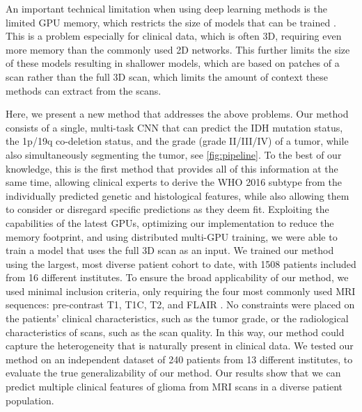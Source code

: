 An important technical limitation when using deep learning methods is the limited GPU memory, which restricts the size of models that can be trained \autocite{kopuklu2019cnn}.
This is a problem especially for clinical data, which is often 3D, requiring even more memory than the commonly used 2D networks.
This further limits the size of these models resulting in shallower models, which are based on patches of a scan rather than the full 3D scan, which limits the amount of context these methods can extract from the scans.

Here, we present a new method that addresses the above problems.
Our method consists of a single, multi-task \gls{CNN} that can predict the \gls{IDH} mutation status, the 1p/19q co-deletion status, and the grade (grade II/III/IV) of a \gls{tumor}, while also simultaneously segmenting the \gls{tumor}, see \cref{fig:pipeline}.
To the best of our knowledge, this is the first method that provides all of this information at the same time, allowing clinical experts to derive the \gls{WHO} 2016 subtype from the individually predicted genetic and histological features, while also allowing them to consider or disregard specific predictions as they deem fit.
Exploiting the capabilities of the latest GPUs, optimizing our implementation to reduce the memory footprint, and using distributed multi-GPU training, we were able to train a model that uses the full 3D scan as an input.
We trained our method using the largest, most diverse patient cohort to date, with 1508 patients included from 16 different institutes.
To ensure the broad applicability of our method, we used minimal inclusion criteria, only requiring the four most commonly used \gls{MRI} sequences: pre-contrast \gls{T1}, \gls{T1C}, \gls{T2}, and \gls{FLAIR} \autocite{thust2018gliomaimaging, fresychlag2018imaging}.
No constraints were placed on the patients' clinical characteristics, such as the \gls{tumor} grade, or the radiological characteristics of scans, such as the scan quality.
In this way, our method could capture the heterogeneity that is naturally present in clinical data.
We tested our method on an independent dataset of 240 patients from 13 different institutes, to evaluate the true generalizability of our method.
Our results show that we can predict multiple clinical features of glioma from \gls{MRI} scans in a diverse patient population.

